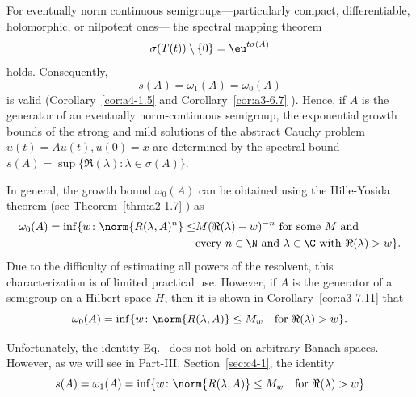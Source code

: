 \begin{remark}\label{rem:a4-1.7}
For eventually norm continuous semigroups---particularly compact, differentiable, holomorphic, or nilpotent ones--- the spectral mapping theorem 
\begin{equation}\label{eq:a4-1.7}
\sigma(T(t)) \setminus \{0\} = \eu^{t \sigma(A)}
\end{equation}
holds. 
Consequently,
\begin{equation}\label{eq:a4-1.8}
s(A) = \omega_1(A) = \omega_{0}(A)
\end{equation}
is valid (Corollary~\ref{cor:a4-1.5} and Corollary~\ref{cor:a3-6.7} ).
Hence, if\/ $A$ is the generator of an eventually norm-continuous semigroup, the exponential growth bounds of the strong and mild solutions of the abstract Cauchy problem $\dot{u}(t) = A u(t), u(0) = x$ are determined by the spectral bound
$s(A) = \sup\{\Re(\lambda)\colon\lambda \in \sigma(A)\}.$
\end{remark}
\begin{remark} In general, the growth bound $\omega_{0}(A)$ can be obtained using the Hille-Yosida theorem (see Theorem~\ref{thm:a2-1.7} ) as
\begin{equation}\label{eq:a4-1.9}
\begin{split}
\omega_{0}(A) = \inf \{ w\colon\norm{R(\lambda, A)^n} \leq &M ( \Re(\lambda) - w)^{-n} \text{ for some } M \text{ and}\\
&\text{every } n \in \N \text{ and } \lambda \in \C \text{ with } \Re(\lambda) > w\}. 
\end{split}
\end{equation}
Due to the difficulty of estimating all powers of the resolvent, this characterization is of limited practical use. 
However, if\/ $A$ is the generator of a semigroup on a Hilbert space $H$, then it is shown in Corollary~\ref{cor:a3-7.11}  that
\begin{equation}\label{eq:a4-1.10}
 \omega_{0}(A) = \inf \{ w\colon\norm{ R(\lambda, A) } \leq M_w \quad \text{for } \Re(\lambda) > w \}.
\end{equation}
\end{remark}
Unfortunately, the identity Eq.~ does not hold on arbitrary Banach spaces. 
However, as we will see in Part-III, Section~\ref{sec:c4-1},  the identity 
\begin{equation}\label{eq:a4-1.11}
 s(A)=\omega_1(A) = \inf \{ w\colon\norm{ R(\lambda, A) } \leq M_w \quad \text{for } \Re(\lambda) > w \}
\end{equation}
